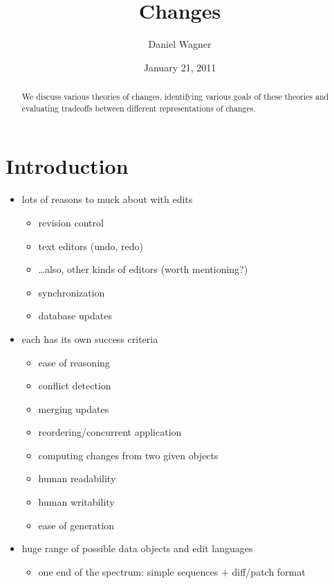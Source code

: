 \documentclass{article}
\begin{document}
\title{Changes}
\author{Daniel Wagner}
\date{January 21, 2011}
\maketitle
\begin{abstract}
    We discuss various theories of changes, identifying various goals of
    these theories and evaluating tradeoffs between different
    representations of changes.
\end{abstract}

\section{Introduction}
\begin{itemize}
    \item lots of reasons to muck about with edits
        \begin{itemize}
            \item revision control
            \item text editors (undo, redo)
            \item \ldots also, other kinds of editors (worth mentioning?)
            \item synchronization
            \item database updates
        \end{itemize}
    \item each has its own success criteria
        \begin{itemize}
            \item ease of reasoning
            \item conflict detection
            \item merging updates
            \item reordering/concurrent application
            \item computing changes from two given objects
            \item human readability
            \item human writability
            \item ease of generation
        \end{itemize}
    \item huge range of possible data objects and edit languages
        \begin{itemize}
            \item one end of the spectrum: simple sequences + diff/patch
                format

\end{itemize}
\end{itemize}
\end{document}
